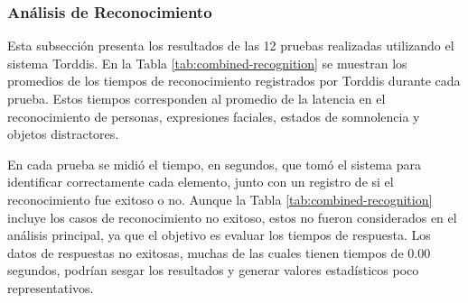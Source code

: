 \documentclass[a4paper,fleqn]{cas-sc}
\begin{document}
				\subsubsection*{Análisis de Reconocimiento}
					Esta subsección presenta los resultados de las 12 pruebas realizadas utilizando el sistema Torddis. En la Tabla \ref{tab:combined-recognition} se muestran los promedios de los tiempos de reconocimiento registrados por Torddis durante cada prueba. Estos tiempos corresponden al promedio de la latencia en el reconocimiento de personas, expresiones faciales, estados de somnolencia y objetos distractores.
					
					En cada prueba se midió el tiempo, en segundos, que tomó el sistema para identificar correctamente cada elemento, junto con un registro de si el reconocimiento fue exitoso o no. Aunque la Tabla \ref{tab:combined-recognition} incluye los casos de reconocimiento no exitoso, estos no fueron considerados en el análisis principal, ya que el objetivo es evaluar los tiempos de respuesta. Los datos de respuestas no exitosas, muchas de las cuales tienen tiempos de 0.00 segundos, podrían sesgar los resultados y generar valores estadísticos poco representativos.
					
\end{document}
